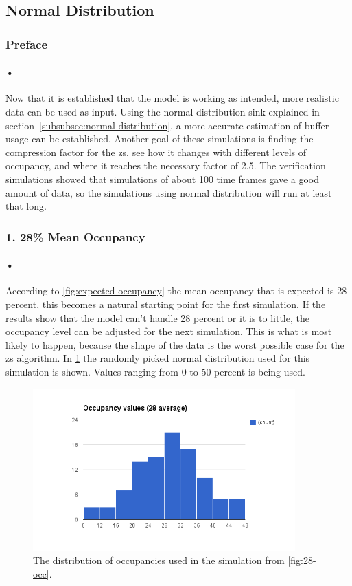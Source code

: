 \documentclass[a4paper, 12pt]{report}\dfrac{\right }{•}
\begin{document}
\subsection{Normal Distribution}

\subsubsection{Preface}

\paragraph{•}
Now that it is established that the model is working as intended, more realistic data can be used as input.
Using the normal distribution sink explained in section~\ref{subsubsec:normal-distribution}, a more accurate estimation of buffer usage can be established.
Another goal of these simulations is finding the compression factor for the \gls{zs}, see how it changes with different levels of occupancy, and where it reaches the necessary factor of 2.5.
The verification simulations showed that simulations of about 100 time frames gave a good amount of data, so the simulations using normal distribution will run at least that long.


\subsubsection{1. 28\% Mean Occupancy}

\paragraph{•}
According to \ref{fig:expected-occupancy} the mean occupancy that is expected is 28 percent, this becomes a natural starting point for the first simulation.
If the results show that the model can't handle 28 percent or it is to little, the occupancy level can be adjusted for the next simulation.
This is what is most likely to happen, because the shape of the data is the worst possible case for the \gls{zs} algorithm. 
In \ref{fig:28-dist} the randomly picked normal distribution used for this simulation is shown.
Values ranging from 0 to 50 percent is being used.

\begin{figure}[h!]
	\centering
		\includegraphics[width=0.9\textwidth]{images/occupancy-28.png}
		\caption{The distribution of occupancies used in the simulation from \ref{fig:28-occ}.}
		\label{fig:28-dist}
\end{figure}
\end{document}
